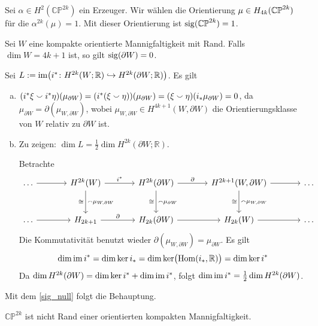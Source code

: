 \begin{beispiel}
	Sei $\alpha \in H^2(\mathbb{CP}^{2k})$ ein Erzeuger.
	Wir wählen die Orientierung $\mu \in H_{4k} \enbrace{\mathbb{CP}^{2k}}$ für die $\alpha^{2k} (\mu)=1$.
	Mit dieser Orientierung ist $\sig \enbrace{\mathbb{CP}^{2k}}=1$.
\end{beispiel}

\begin{satz}
	Sei $W$ eine kompakte orientierte Mannigfaltigkeit mit Rand.
	Falls $\dim W = 4k+1$ ist, so gilt $\sig(\partial W)=0$.
\end{satz}
\begin{beweis}
	Sei $L :=  \im \enbrace[\big]{i^* \colon H^{2k}(W;\mathbb{R}) \hookrightarrow H^{2k}(\partial W;\mathbb{R})}$. Es gilt
	\begin{enumerate}[a)]
		\item $(i^* \xi \cupp i^* \eta) (\mu_{\partial W}) = \enbrace*{i^*(\xi \cupp \eta)}(\mu_{\partial W})= (\xi \cupp \eta) \enbrace*{i_* \mu_{\partial W}} =0$, da $\mu_{\partial W}=\partial (\mu_{W,\partial W})$, wobei $\mu_{W,\partial W} \in H^{4k+1}(W,\partial W)$ die Orientierungsklasse von $W$ relativ zu $\partial W$ ist.
		\item Zu zeigen: $\dim L = \frac{1}{2} \dim H^{2k}(\partial W;\mathbb{R})$.
		
		Betrachte 
		\[
			\begin{tikzcd}[sep=large]
				\ldots  \rar & H^{2k}(W) \dar["\capp \mu_{W,\partial W}","\cong"'] \rar["i^*"] & H^{2k}(\partial W)  \dar["\capp \mu_{\partial W}","\cong"']\rar["\partial"] & H^{2k+1}(W,\partial W) \rar \dar["\capp \mu_{W,\partial W}","\cong"']& \ldots \\
				\ldots \rar & H_{2k+1} \rar["\partial"] & H_{2k}(\partial W) \rar & H_{2k}(W) \rar & \ldots 
			\end{tikzcd}
		\]
		Die Kommutativität benutzt wieder $\partial (\mu_{W,\partial W})=\mu_{\partial W}$.
		Es gilt
		\[
			\dim \im i^* = \dim \ker i_* = \dim \ker \enbrace[\big]{\Hom(i_*,\mathbb{R})} = \dim \ker i^*
		\]
		Da $\dim H^{2k}(\partial W) = \dim \ker i^* + \dim \im i^*$, folgt $\dim \im i^* = \frac{1}{2} \dim H^{2k}(\partial W)$. 
	\end{enumerate}
	Mit dem \autoref{sig_null} folgt die Behauptung.
\end{beweis}

\begin{korollarB}
	$\mathbb{CP}^{2k}$ ist nicht Rand einer orientierten kompakten Mannigfaltigkeit.
\end{korollarB}

